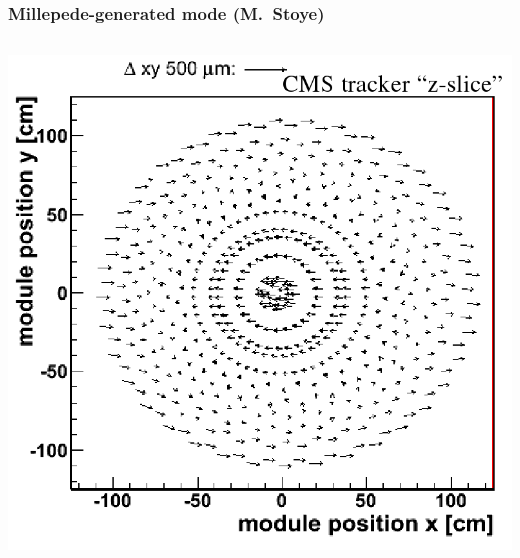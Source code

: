 \documentclass[compress]{beamer}
\begin{document}
\begin{frame}
\frametitle{{\large Millepede-generated mode} {\normalsize (M.~Stoye)}}

\begin{columns}
\begin{columns}
\includegraphics[width=\linewidth]{stoye_deformation.png}

\end{columns}
\end{columns}
\end{frame}
\end{document}

